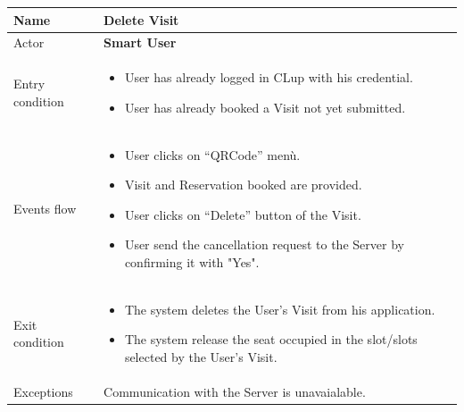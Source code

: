 \begin{tabular}{|p{5cm} | p{7cm} | }
	\hline
	Name & \textbf{Delete Visit} \\
	\hline
	Actor & \textbf{Smart User} \\
	\hline
	Entry condition &
	\begin{itemize}
		\item User has already logged in CLup with his credential. 
		\item User has already booked a Visit not yet submitted. 
	\end{itemize} \\
	\hline
	Events flow & 
	\begin{itemize}
		\item User clicks on “QRCode” menù.
		\item Visit and Reservation booked are provided.
		\item User clicks on “Delete” button of the Visit.
		\item User send the cancellation request to the Server by confirming it with "Yes".
	\end{itemize} \\
	\hline
	Exit condition &
	\begin{itemize}	
		\item The system deletes the User's Visit from his application.
		\item The system release the seat occupied in the slot/slots selected by the User's Visit.
	\end{itemize} \\
	\hline 
	Exceptions & Communication with the Server is unavaialable. \\ 
	\hline
\end{tabular}

\par \medskip

